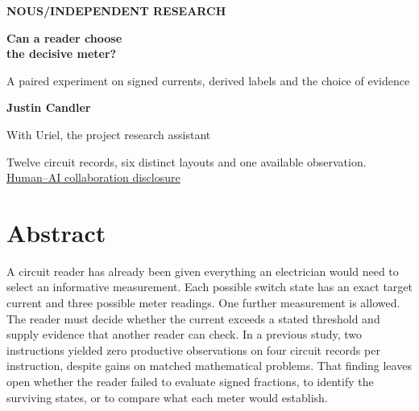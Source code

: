 \documentclass[12pt,letterpaper]{article}
\begin{document}
\thispagestyle{empty}
\begin{center}
\vspace*{.42in}
{\sffamily\small\bfseries\color{accent}NOUS\enspace /\enspace INDEPENDENT RESEARCH}\par
\vspace{.58in}
{\fontsize{34}{40}\selectfont\bfseries\color{ink}Can a reader choose\\ the decisive meter?\par}
\vspace{.28in}
\begin{minipage}{.85\linewidth}\centering\Large\color{mute}A paired experiment on signed currents, derived labels and the choice of evidence\end{minipage}\par
\vspace{.44in}
{\large\bfseries Justin Candler}\par
{\small With Uriel, the project research assistant}\par
\vspace{.2in}{\small 24 November 2026}\par
\vspace{.36in}\par
\end{center}\vfill
\begin{center}\small Twelve circuit records, six distinct layouts and one available observation.\\[3pt]\hyperref[collab]{Human--AI collaboration disclosure}\end{center}
\clearpage{}
\section*{Abstract}
A circuit reader has already been given everything an electrician would need to select an informative measurement. Each possible switch state has an exact target current and three possible meter readings. One further measurement is allowed. The reader must decide whether the current exceeds a stated threshold and supply evidence that another reader can check. In a previous study, two instructions yielded zero productive observations on four circuit records per instruction, despite gains on matched mathematical problems. That finding leaves open whether the reader failed to evaluate signed fractions, to identify the surviving states, or to compare what each meter would establish.
\end{document}
